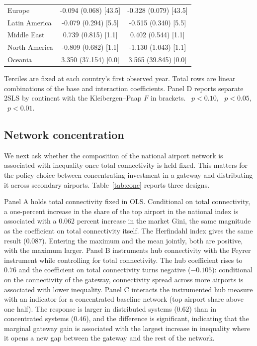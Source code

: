 \begin{table}[H]
\begin{threeparttable}
\begin{tabular}{lcc}
Europe & -0.094 (0.068) [43.5] & -0.328\sym{***} (0.079) [43.5] \\
Latin America & -0.079 (0.294) [5.5] & -0.515 (0.340) [5.5] \\
Middle East & 0.739 (0.815) [1.1] & 0.402 (0.544) [1.1] \\
North America & -0.809 (0.682) [1.1] & -1.130 (1.043) [1.1] \\
Oceania & 3.350 (37.154) [0.0] & 3.565 (39.845) [0.0] \\
\bottomrule
\end{tabular}
\begin{tablenotes}\footnotesize\item Terciles are fixed at each country's first observed year. Total rows are linear combinations of the base and interaction coefficients. Panel D reports separate 2SLS by continent with the Kleibergen--Paap $F$ in brackets. \sym{*}~$p<0.10$, \sym{**}~$p<0.05$, \sym{***}~$p<0.01$.\end{tablenotes}\end{threeparttable}\end{table}

\subsection{Network concentration}
\label{sec:conc}
We next ask whether the composition of the national airport network is associated with inequality once total connectivity is held fixed. This matters for the policy choice between concentrating investment in a gateway and distributing it across secondary airports. Table~\ref{tab:conc} reports three designs.

Panel A holds total connectivity fixed in OLS. Conditional on total connectivity, a one-percent increase in the share of the top airport in the national index is associated with a $0.062$ percent increase in the market Gini, the same magnitude as the coefficient on total connectivity itself. The Herfindahl index gives the same result ($0.087$). Entering the maximum and the mean jointly, both are positive, with the maximum larger. Panel B instruments hub connectivity with the Feyrer instrument while controlling for total connectivity. The hub coefficient rises to $0.76$ and the coefficient on total connectivity turns negative ($-0.105$): conditional on the connectivity of the gateway, connectivity spread across more airports is associated with lower inequality. Panel C interacts the instrumented hub measure with an indicator for a concentrated baseline network (top airport share above one half). The response is larger in distributed systems ($0.62$) than in concentrated systems ($0.46$), and the difference is significant, indicating that the marginal gateway gain is associated with the largest increase in inequality where it opens a new gap between the gateway and the rest of the network.

